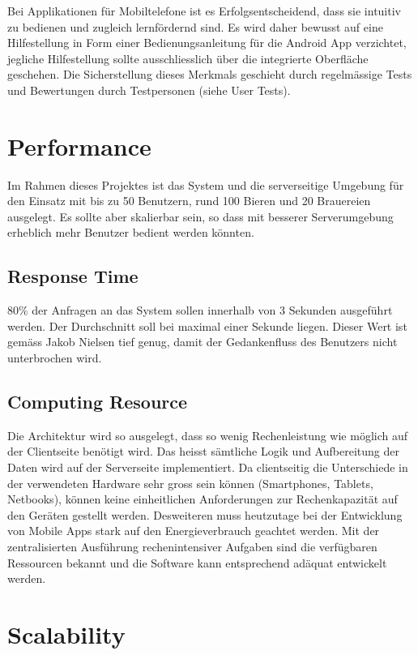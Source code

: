 \documentclass[10pt,a4paper]{scrartcl}
\begin{document}
	Bei Applikationen für Mobiltelefone ist es Erfolgsentscheidend, dass sie intuitiv zu bedienen und zugleich lernfördernd sind. Es wird daher bewusst auf eine Hilfestellung in Form einer Bedienungsanleitung für die Android App verzichtet, jegliche Hilfestellung sollte ausschliesslich über die integrierte Oberfläche geschehen. Die Sicherstellung dieses Merkmals geschieht durch regelmässige Tests und Bewertungen durch Testpersonen (siehe User Tests).


\section{Performance}

Im Rahmen dieses Projektes ist das System und die serverseitige Umgebung für den Einsatz mit  bis zu 50 Benutzern, rund 100 Bieren und 20 Brauereien ausgelegt. Es sollte aber skalierbar sein, so dass mit besserer Serverumgebung erheblich mehr Benutzer bedient werden könnten.

	\subsection{Response Time}

	80\% der Anfragen an das System sollen innerhalb von 3 Sekunden ausgeführt werden.
	Der Durchschnitt soll bei maximal einer Sekunde liegen. Dieser Wert ist gemäss Jakob Nielsen tief genug, damit der Gedankenfluss des Benutzers nicht unterbrochen wird\cite{nielsen1993usability}.

	\subsection{Computing Resource}

	Die Architektur wird so ausgelegt, dass so wenig Rechenleistung wie möglich auf der Clientseite benötigt wird. Das heisst sämtliche Logik und Aufbereitung der Daten wird auf der Serverseite implementiert. Da clientseitig die Unterschiede in der verwendeten Hardware sehr gross sein können (Smartphones, Tablets, Netbooks), können keine einheitlichen Anforderungen zur Rechenkapazität auf den Geräten gestellt werden. Desweiteren muss heutzutage bei der Entwicklung von Mobile Apps stark auf den Energieverbrauch geachtet werden. Mit der zentralisierten Ausführung rechenintensiver Aufgaben sind die verfügbaren Ressourcen bekannt und die Software kann entsprechend adäquat entwickelt werden.

\section{Scalability}
\end{document}

